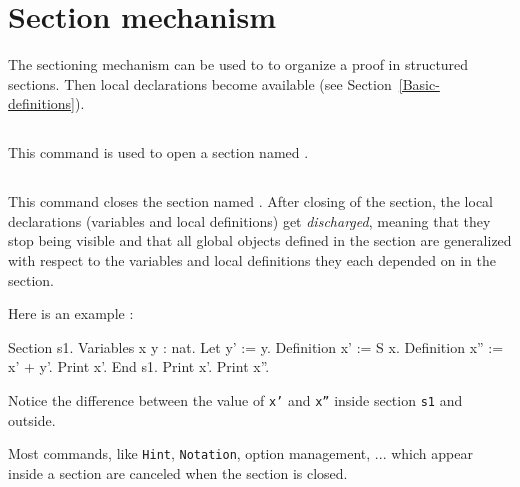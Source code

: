 \section{Section mechanism
\label{Section}}

The sectioning mechanism can be used to to organize a proof in
structured sections. Then local declarations become available (see
Section~\ref{Basic-definitions}).

\subsection{}

This command is used to open a section named {\ident}.


\subsection{}

This command closes the section named {\ident}. After closing of the
section, the local declarations (variables and local definitions) get
{\em discharged}, meaning that they stop being visible and that all
global objects defined in the section are generalized with respect to
the variables and local definitions they each depended on in the
section.


Here is an example :
\begin{coq_example}
Section s1.
Variables x y : nat.
Let y' := y.
Definition x' := S x.
Definition x'' := x' + y'.
Print x'.
End s1.
Print x'.
Print x''.
\end{coq_example}
Notice the difference between the value of {\tt x'} and {\tt x''}
inside section {\tt s1} and outside.

\begin{ErrMsgs}
\item {}
\end{ErrMsgs}

\begin{Remarks}
\item Most commands, like {\tt Hint}, {\tt Notation}, option management, ...
which appear inside a section are canceled when the
section is closed.

\end{Remarks}

